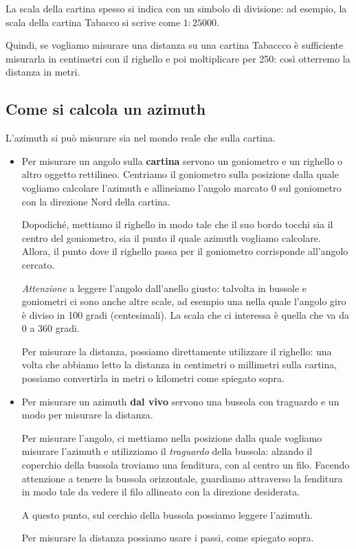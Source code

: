 \documentclass[12pt]{article}
\begin{document}
La scala della cartina spesso si indica con un simbolo di divisione: ad esempio, la scala della cartina Tabacco si scrive come \(1 : \num{25000}\). 

Quindi, se vogliamo misurare una distanza su una cartina Tabaccco è sufficiente misurarla in centimetri con il righello e poi moltiplicare per 250: così otterremo la distanza in metri. 

\subsection*{Come si calcola un azimuth}

L'azimuth si può misurare sia nel mondo reale che sulla cartina. 

\begin{itemize}[label=$-$]
  \item Per misurare un angolo sulla \textbf{cartina} servono un goniometro e un righello o altro oggetto rettilineo. Centriamo il goniometro sulla posizione dalla quale vogliamo calcolare l'azimuth e allineiamo l'angolo marcato 0 sul goniometro con la direzione Nord della cartina. 
  
  Dopodiché, mettiamo il righello in modo tale che il suo bordo tocchi sia il centro del goniometro, sia il punto il quale azimuth vogliamo calcolare. Allora, il punto dove il righello passa per il goniometro corrisponde all'angolo cercato.
  
  \emph{Attenzione} a leggere l'angolo dall'anello giusto: talvolta in bussole e goniometri ci sono anche altre scale, ad esempio una nella quale l'angolo giro è diviso in 100 gradi (centesimali). La scala che ci interessa è quella che va da 0 a 360 gradi. 

  Per misurare la distanza, possiamo direttamente utilizzare il righello: una volta che abbiamo letto la distanza in centimetri o millimetri sulla cartina, possiamo convertirla in metri o kilometri come spiegato sopra.  
  \item Per misurare un azimuth \textbf{dal vivo} servono una bussola con traguardo e un modo per misurare la distanza. 
  
  Per misurare l'angolo, ci mettiamo nella posizione dalla quale vogliamo misurare l'azimuth e utilizziamo il \emph{traguardo} della bussola: alzando il coperchio della bussola troviamo una fenditura, con al centro un filo. 
  Facendo attenzione a tenere la bussola orizzontale, guardiamo attraverso la fenditura in modo tale da vedere il filo allineato con la direzione desiderata. 

  A questo punto, sul cerchio della bussola possiamo leggere l'azimuth. 

  Per misurare la distanza possiamo usare i passi, come spiegato sopra. 
\end{itemize}
\end{document}
